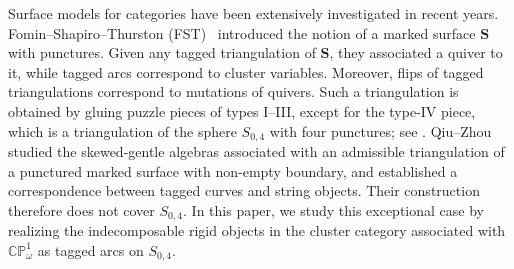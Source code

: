 \documentclass[11pt,a4paper,reqno]{amsart}%
\theoremstyle{plain}
\theoremstyle{definition}
\numberwithin{equation}{section}
\numberwithin{equation}{section}
\def\surf{\mathbf{S}} %
\def\wt{\omega}
\def\surf{\mathbf{S}}                       %
\def\CPone{\mathbb{CP}^1_{\wt}}
\begin{document}
  


Surface models for categories have been extensively investigated in recent years. Fomin--Shapiro--Thurston (FST)~\cite{FST} introduced the notion of a marked surface $\surf$ with punctures.
Given any tagged triangulation of $\surf$, they associated a quiver to it, while tagged arcs correspond to cluster variables. Moreover, flips of tagged triangulations correspond to mutations of quivers. Such a triangulation is obtained by gluing puzzle pieces of types I--III, except for the type-IV piece, which is a triangulation of the sphere $S_{0,4}$ with four punctures; see . Qiu--Zhou~\cite{QZ1} studied the skewed-gentle algebras associated with an admissible triangulation of a punctured marked surface with non-empty boundary, and established a correspondence between tagged curves and string objects. Their construction therefore does not cover $S_{0,4}$. In this paper, we study this exceptional case by realizing the indecomposable rigid objects in the cluster category associated with $\CPone$ as tagged arcs on $S_{0,4}$.
\end{document}
